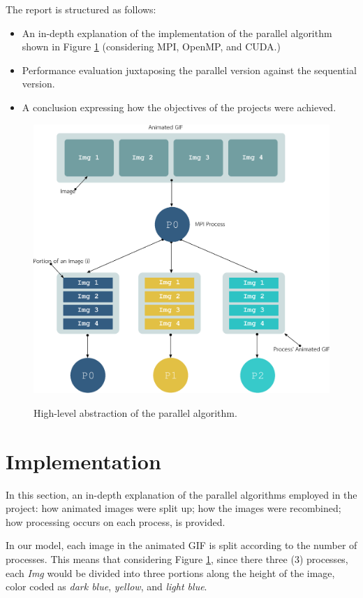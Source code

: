 \documentclass[11pt]{article}
\begin{document}
The report is structured as follows:
\begin{itemize}
	\item An in-depth explanation of the implementation of the parallel algorithm shown in Figure \ref{fig:overview} (considering MPI, OpenMP, and CUDA.)
	\item Performance evaluation juxtaposing the parallel version against the sequential version.
	\item A conclusion expressing how the objectives of the projects were achieved.
\end{itemize}
\begin{figure}[t!]
	\centering
	\includegraphics[scale=0.45]{INF560-Image-Filtering-EPS.eps}
	\label{fig:overview}
	\caption{High-level abstraction of the parallel algorithm.}
\end{figure}

\section{Implementation}

In this section, an in-depth explanation of the parallel algorithms employed in the project: how animated images were split up; how the images were recombined; how processing occurs on each process, is provided.

In our model, each image in the animated GIF is split according to the number of processes. This means that considering Figure \ref{fig:overview}, since there three (3) processes, each \textit{Img} would be divided into three portions along the height of the image, color coded as \textit{dark blue}, \textit{yellow}, and \textit{light blue}.
\end{document}

